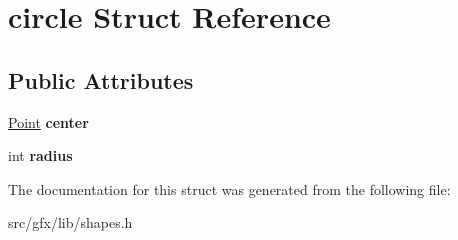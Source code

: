\hypertarget{structcircle}{}\section{circle Struct Reference}
\label{structcircle}
\subsection*{Public Attributes}
\begin{DoxyCompactItemize}
\item 
\mbox{\label{structcircle_affff22b8a8d7c15591f425e5b77cff86}} 
\hyperlink{structcoordinate}{Point} {\bfseries center}
\item 
\mbox{\label{structcircle_a21c7b675591358ef27b64af21fae7b18}} 
int {\bfseries radius}
\end{DoxyCompactItemize}


The documentation for this struct was generated from the following file\+:\begin{DoxyCompactItemize}
\item 
src/gfx/lib/shapes.\+h\end{DoxyCompactItemize}
